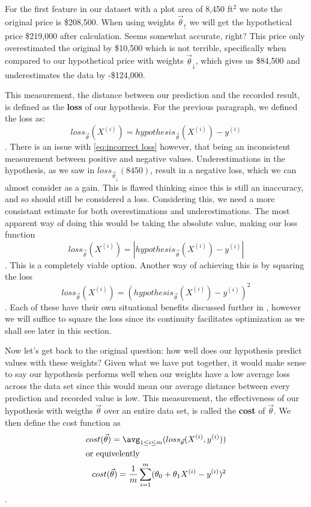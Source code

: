 For the first feature in our dataset with a plot area of 8,450 ft$^2$ we note the original price is \$208,500. When using weights $\vec\theta_{\uparrow}$ we will get the hypothetical price \$219,000 after calculation. Seems somewhat accurate, right? This price only overestimated the original by \$10,500 which is not terrible, specifically when compared to our hypothetical price  with weights $\vec\theta_{\downarrow}$, which gives us \$84,500 and underestimates the data by -\$124,000.

This measurement, the distance between our prediction and the recorded result,
is defined as the \textbf{loss} of our hypothesis. For the previous paragraph, we defined the loss as:
\begin{equation}\label{eq:incorrect loss}
	loss_{\vec\theta}(X^{(i)}) = hypothesis_{\vec\theta}(X^{(i)})-y^{(i)}
\end{equation}
. There is an issue with \ref{eq:incorrect loss} however, that being an inconsistent measurement between positive and negative values. Underestimations in the hypothesis, as we saw in $loss_{\vec\theta_{\downarrow}}(8450)$, result in a negative loss, which we can almost consider as a gain. This is flawed thinking since this is still an inaccuracy, and so should still be considered a loss. Considering this, we need a more consistant estimate for both overestimations and underestimations. The most apparent way of doing this would be taking the absolute value, making our loss function
\begin{equation}
	loss_{\vec\theta}(X^{(i)}) = |hypothesis_{\vec\theta}(X^{(i)}) - y^{(i)}|
\end{equation}
. This is a completely viable option. Another way of achieving this is by
squaring the loss
\begin{equation}
	loss_{\vec\theta}(X^{(i)}) = (hypothesis_{\vec\theta}(X^{(i)}) - y^{(i)})^2
\end{equation}
. Each of these have their own situational benefits discussed further in
\placeholder, however we will suffice to square the loss since its continuity
facilitates optimization as we shall see later in this section.

Now let's get back to the original question: how well does our hypothesis
predict values with these weights? Given what we have put together, it would
make sense to say our hypothesis performs well when our weights have a low
average loss across the data set since this would mean our average distance
between every prediction and recorded value is low. This measurement, the
effectiveness of our hypothesis with weigths $\vec\theta$ over an entire data set, is
called the \textbf{cost} of $\vec\theta$. We then define the cost function as
\begin{subequations}
    \begin{align}
        cost(\vec\theta) = \avg_{1\leq i\leq m} (loss_{\vec\theta}(X^{(i)}, y^{(i)})) \\
    \intertext{or equivelently}
        cost(\vec\theta) = \frac{1}{m}\sum_{i=1}^m (\theta_0 + \theta_1X^{(i)} -
        y^{(i)})^2
    \end{align}
\end{subequations}
.

